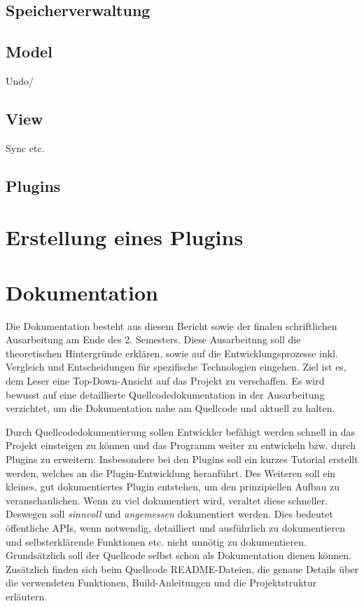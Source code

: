 \subsection{Speicherverwaltung}


\subsection{Model}
Undo/

\subsection{View}

Sync etc.

\subsection{Plugins}


\section{Erstellung eines Plugins}

\section{Dokumentation}

Die Dokumentation besteht aus diesem Bericht sowie der finalen schriftlichen Ausarbeitung am Ende des 2. Semesters.
Diese Ausarbeitung soll die theoretischen Hintergründe erklären, sowie auf die Entwicklungsprozesse inkl. Vergleich und Entscheidungen für spezifische Technologien eingehen.
Ziel ist es, dem Leser eine Top-Down-Ansicht auf das Projekt zu verschaffen.
Es wird bewusst auf eine detaillierte Quellcodedokumentation in der Ausarbeitung verzichtet, um die Dokumentation nahe am Quellcode und aktuell zu halten.

Durch Quellcodedokumentierung sollen Entwickler befähigt werden schnell in das Projekt einsteigen zu können und das Programm weiter zu entwickeln bzw. durch Plugins zu erweitern.
Insbesondere bei den Plugins soll ein kurzes Tutorial erstellt werden, welches an die Plugin-Entwicklung heranführt. 
Des Weiteren soll ein kleines, gut dokumentiertes Plugin entstehen, um den prinzipiellen Aufbau zu veranschaulichen.
Wenn zu viel dokumentiert wird, veraltet diese schneller.
Deswegen soll \emph{sinnvoll} und \emph{angemessen} dokumentiert werden.
Dies bedeutet öffentliche APIs, wenn notwendig, detailliert und ausführlich zu dokumentieren und selbsterklärende Funktionen etc. nicht unnötig zu dokumentieren.
Grundsätzlich soll der Quellcode selbst schon als Dokumentation dienen können.
Zusätzlich finden sich beim Quellcode README-Dateien, die genaue Details über die verwendeten Funktionen, Build-Anleitungen und die Projektstruktur erläutern.

